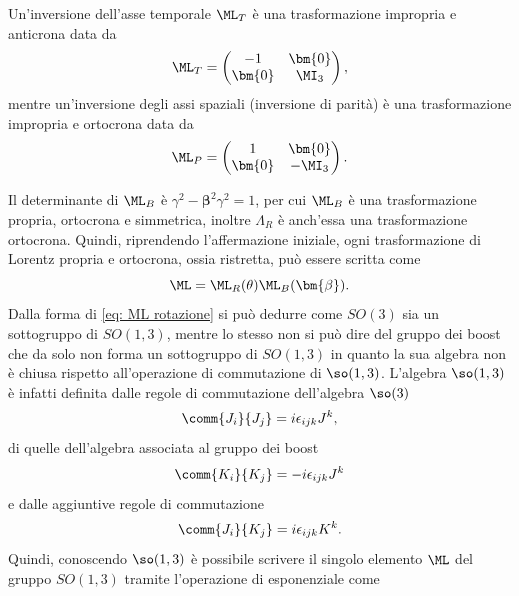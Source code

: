\begin{obs}
    Un'inversione dell'asse temporale $\ML_T$ è una trasformazione impropria e anticrona data da 
    \begin{equation}
        \ML_T = 
        \begin{pmatrix}
            -1 & \bm{0} \\
            \bm{0} & \MI_3
        \end{pmatrix},
    \end{equation}
    mentre un'inversione degli assi spaziali (inversione di parità) è una trasformazione impropria e ortocrona data da
    \begin{equation}
        \ML_P = 
        \begin{pmatrix}
            1 & \bm{0} \\
            \bm{0} & -\MI_3
        \end{pmatrix}.
    \end{equation}
\end{obs}
Il determinante di $\ML_B$ è $\gamma^2 - \bm{\beta}^2\gamma^2 = 1$, per cui $\ML_B$ è una trasformazione propria, ortocrona e simmetrica, inoltre $\Lambda_R$ è anch'essa una trasformazione ortocrona. Quindi, riprendendo l'affermazione iniziale, ogni trasformazione di Lorentz propria e ortocrona, ossia ristretta, può essere scritta come 
\begin{equation}
    \ML = \ML_R(\theta)\ML_B(\bm{\beta}).
\end{equation}
Dalla forma di \eqref{eq: ML rotazione} si può dedurre come $SO(3)$ sia un sottogruppo di $SO(1,3)$, mentre lo stesso non si può dire del gruppo dei boost che da solo non forma un sottogruppo di $SO(1,3)$ in quanto la sua algebra non è chiusa rispetto all'operazione di commutazione di $\so(1,3)$. L'algebra $\so(1,3)$ è infatti definita dalle regole di commutazione dell'algebra $\so(3)$
\begin{equation}
\label{eq: regole commutazione so(3)}
    \comm{J_i}{J_j} = i\epsilon_{ijk}J^k,
\end{equation}
di quelle dell'algebra associata al gruppo dei boost
\begin{equation}
\label{eq: regole commutazione boost}
    \comm{K_i}{K_j} = -i\epsilon_{ijk}J^k
\end{equation}
e dalle aggiuntive regole di commutazione
\begin{equation}
    \comm{J_i}{K_j} = i\epsilon_{ijk}K^k.
\end{equation}
Quindi, conoscendo $\so(1,3)$ è possibile scrivere il singolo elemento $\ML$ del gruppo $SO(1,3)$ tramite l'operazione di esponenziale come
